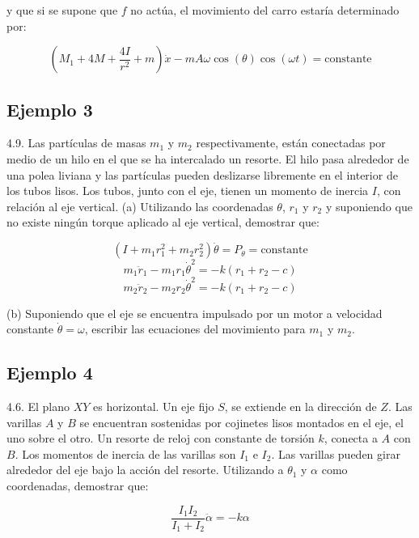 y que si se supone que $f$ no actúa, el movimiento del carro estaría determinado
por:

\begin{equation*}
    \left(M_1+4M+\frac{4I}{r^2}+m\right)\dot{x}-
    mA\omega\cos(\theta)\cos(\omega t)=\text{constante}
\end{equation*}

\subsection{Ejemplo 3}
4.9. Las partículas de masas $m_1$ y $m_2$ respectivamente, están conectadas por
medio de un hilo en el que se ha intercalado un resorte. El hilo pasa alrededor
de una polea liviana y las partículas pueden deslizarse libremente en el
interior de los tubos lisos. Los tubos, junto con el eje, tienen un momento de
inercia $I$, con relación al eje vertical.
(a) Utilizando las coordenadas $\theta$, $r_1$ y $r_2$ y suponiendo que no
existe ningún torque aplicado al eje vertical, demostrar que:

\begin{equation*}
    (I+m_1r^2_1+m_2r^2_2)\dot{\theta}=P_{\theta}=\text{constante}
\end{equation*}
\begin{equation*}
    m_1\ddot{r}_1-m_1 r_1\dot{\theta}^2=-k(r_1+r_2-c)
\end{equation*}
\begin{equation*}
    m_2\ddot{r}_2-m_2 r_2\dot{\theta}^2=-k(r_1+r_2-c)
\end{equation*}

(b) Suponiendo que el eje se encuentra impulsado por un motor a velocidad
constante $\dot{\theta}=\omega$, escribir las ecuaciones del movimiento para
$m_1$ y $m_2$.

\subsection{Ejemplo 4}
4.6. El plano $XY$ es horizontal. Un eje fijo $S$, se extiende en la dirección
de $Z$. Las varillas $A$ y $B$ se encuentran sostenidas por cojinetes lisos
montados en el eje, el uno sobre el otro. Un resorte de reloj con constante de
torsión $k$, conecta a $A$ con $B$. Los momentos de inercia de las varillas son
$I_1$ e $I_2$. Las varillas pueden girar alrededor del eje bajo la acción del
resorte. Utilizando a $\theta_1$ y $\alpha$ como coordenadas, demostrar que:

\begin{equation*}
    \frac{I_1 I_2}{I_1+I_2}\ddot{\alpha}=-k\alpha
\end{equation*}

